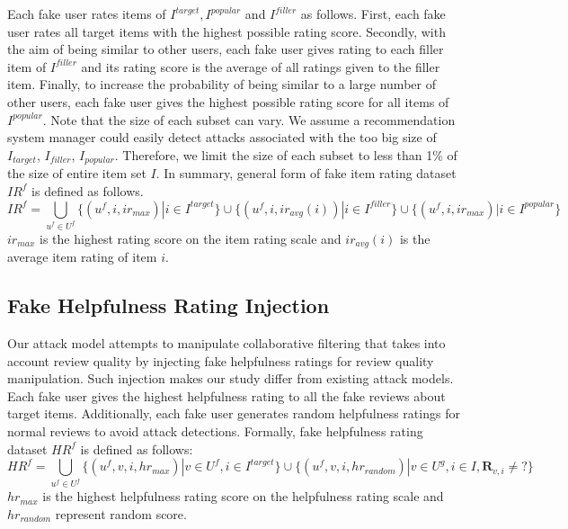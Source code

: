 \documentclass[master,english,final]{kaist-ucs}
\begin{document}
Each fake user rates items of $I^{target},I^{popular}$ and $I^{filler}$ as follows.
First, each fake user rates all target items with the highest possible rating score.
Secondly, with the aim of being similar to other users, each fake user gives rating to each filler item of $I^{filler}$ and its rating score is the average of all ratings given to the filler item.
Finally, to increase the probability of being similar to a large number of other users, each fake user gives the highest possible rating score for all items of $I^{popular}$.
Note that the size of each subset can vary.
We assume a recommendation system manager could easily detect attacks associated with the too big size of $I_{target}$, $I_{filler}$, $I_{popular}$.
Therefore, we limit the size of each subset to less than 1\% of the size of entire item set $I$.
In summary, general form of fake item rating dataset $IR^f$ is defined as follows.
\begin{equation}
{IR}^f = \bigcup_{u^f \in U^f} \{(u^f,i,ir_{max}) | i \in I^{target} \} \cup \{(u^f,i,ir_{avg} {(i)}) | i \in I^{filler} \} \cup \{(u^f,i,ir_{max}) | i \in I^{popular} \}
\end{equation}
$ir_{max}$  is the highest rating score on the item rating scale and $ir_{avg} {(i)}$ is the average item rating of item $i$.

\subsection{Fake Helpfulness Rating Injection}
Our attack model attempts to manipulate collaborative filtering that takes into account review quality by injecting fake helpfulness ratings for review quality manipulation.
Such injection makes our study differ from existing attack models.
Each fake user gives the highest helpfulness rating to all the fake reviews about target items.
Additionally, each fake user generates random helpfulness ratings for normal reviews to avoid attack detections.
Formally, fake helpfulness rating dataset $HR^f$ is defined as follows:
\begin{equation}
HR^f = \bigcup_{u^f \in U^f} \{(u^f,v, i, hr_{max}) | v \in U^f,i \in I^{target} \} \cup \{(u^f,v,i,hr_{random}) | v \in U^g, i \in I, \bm{R}_{v,i} \neq ? \}
\end{equation}
$hr_{max}$ is the highest helpfulness rating score on the helpfulness rating scale and $hr_{random}$ represent random score.
\end{document}
